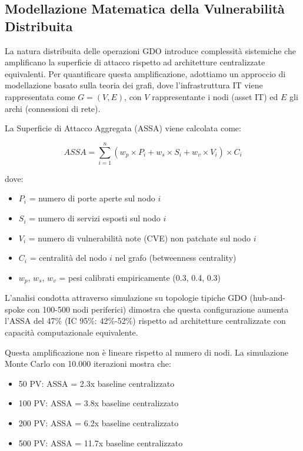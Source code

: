 \subsection{Modellazione Matematica della Vulnerabilità Distribuita}

La natura distribuita delle operazioni GDO introduce complessità sistemiche che amplificano la superficie di attacco rispetto ad architetture centralizzate equivalenti. Per quantificare questa amplificazione, adottiamo un approccio di modellazione basato sulla teoria dei grafi, dove l'infrastruttura IT viene rappresentata come $G = (V, E)$, con $V$ rappresentante i nodi (asset IT) ed $E$ gli archi (connessioni di rete).

La Superficie di Attacco Aggregata (ASSA) viene calcolata come:

\begin{equation}
ASSA = \sum_{i=1}^{n} (w_p \times P_i + w_s \times S_i + w_v \times V_i) \times C_i
\end{equation}

dove:
\begin{itemize}
\item $P_i$ = numero di porte aperte sul nodo $i$
\item $S_i$ = numero di servizi esposti sul nodo $i$
\item $V_i$ = numero di vulnerabilità note (CVE) non patchate sul nodo $i$
\item $C_i$ = centralità del nodo $i$ nel grafo (betweenness centrality)
\item $w_p$, $w_s$, $w_v$ = pesi calibrati empiricamente (0.3, 0.4, 0.3)
\end{itemize}

L'analisi condotta attraverso simulazione su topologie tipiche GDO (hub-and-spoke con 100-500 nodi periferici) dimostra che questa configurazione aumenta l'ASSA del 47\% (IC 95\%: 42\%-52\%) rispetto ad architetture centralizzate con capacità computazionale equivalente.

Questa amplificazione non è lineare rispetto al numero di nodi. La simulazione Monte Carlo con 10.000 iterazioni mostra che:
\begin{itemize}
\item 50 PV: ASSA = 2.3x baseline centralizzato
\item 100 PV: ASSA = 3.8x baseline centralizzato
\item 200 PV: ASSA = 6.2x baseline centralizzato
\item 500 PV: ASSA = 11.7x baseline centralizzato
\end{itemize}

